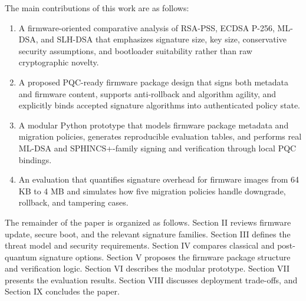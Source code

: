 The main contributions of this work are as follows:
\begin{enumerate}
\item A firmware-oriented comparative analysis of RSA-PSS, ECDSA P-256, ML-DSA, and SLH-DSA that emphasizes signature size, key size, conservative security assumptions, and bootloader suitability rather than raw cryptographic novelty.
\item A proposed PQC-ready firmware package design that signs both metadata and firmware content, supports anti-rollback and algorithm agility, and explicitly binds accepted signature algorithms into authenticated policy state.
\item A modular Python prototype that models firmware package metadata and migration policies, generates reproducible evaluation tables, and performs real ML-DSA and SPHINCS+-family signing and verification through local PQC bindings.
\item An evaluation that quantifies signature overhead for firmware images from 64 KB to 4 MB and simulates how five migration policies handle downgrade, rollback, and tampering cases.
\end{enumerate}

The remainder of the paper is organized as follows. Section II reviews firmware update, secure boot, and the relevant signature families. Section III defines the threat model and security requirements. Section IV compares classical and post-quantum signature options. Section V proposes the firmware package structure and verification logic. Section VI describes the modular prototype. Section VII presents the evaluation results. Section VIII discusses deployment trade-offs, and Section IX concludes the paper.
